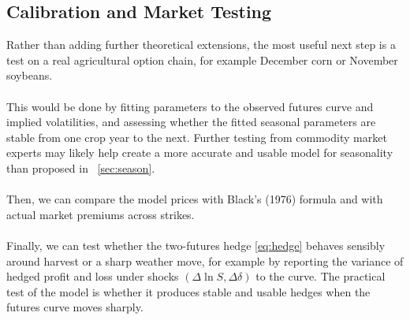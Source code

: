 \documentclass[12pt,a4paper]{article}
\begin{document}
\subsection{Calibration and Market Testing}\label{sec:market}

Rather than adding further theoretical extensions, the most useful next step is a test on a real agricultural option chain, for example December corn or November soybeans.\\\\
This would be done by fitting parameters to the observed futures curve and implied volatilities, and assessing whether the fitted seasonal parameters are stable from one crop year to the next. Further testing from commodity market experts may likely help create a more accurate and usable model for seasonality than proposed in ~\ref{sec:season}.\\\\
Then, we can compare the model prices with Black's (1976) formula and with actual market premiums across strikes.\\\\
Finally, we can test whether the two-futures hedge \eqref{eq:hedge} behaves sensibly around harvest or a sharp weather move, for example by reporting the variance of hedged profit and loss under shocks $(\Delta\ln S,\Delta\delta)$ to the curve. The practical test of the model is whether it produces stable and usable hedges when the futures curve moves sharply.

\newpage
\end{document}
